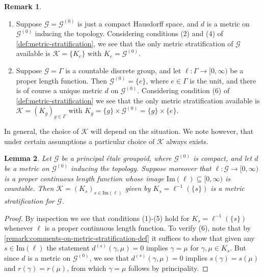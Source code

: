 \documentclass[11pt,a4paper,oneside,final,reqno]{amsart}
\newtheorem{lemma}{Lemma}[section]
\theoremstyle{definition}
\newtheorem{remark}[lemma]{Remark}
\newcommand{\G}{\mathcal{G}}
\newcommand{\Go}{\mathcal{G}^{(0)}}
\newcommand{\cK}{\mathcal{K}}
\newcommand{\Ima}{\mathrm{Im}}
\numberwithin{equation}{section}
\begin{document}
	\begin{remark}\label{remark:stratifications-degenerate-cases}
		\begin{enumerate}
			\item 	Suppose $\G = \Go$ is just a compact Hausdorff space, 
			and $d$ is a metric on $\Go$ inducing the topology.
			Considering 
			conditions (2) and (4)
			of \cref{def:metric-stratification}, we see that the only metric stratification of $\G$ available is $\cK= \{ K_e\}$ with $K_e = \Go$.
			\item Suppose $\G = \Gamma$ is a countable discrete group, and let $\ell \colon \Gamma \to [0,\infty)$ be a proper length function. Then $\Go = \{e\}$, where $e \in \Gamma$ is the unit, and there is of course a unique metric $d$ on $\Go$.  
			Considering condition (6) of \cref{def:metric-stratification} we see that the only metric stratification available is $\cK= (K_g)_{g\in \Gamma}$ with $K_g = \{g\} \times \Go = \{g\} \times \{e\}$. 
		\end{enumerate}
	
	\end{remark}
	
	In general, the choice of $\cK$ will depend on the situation. We note however, that under certain assumptions a particular choice of $\cK$ always exists. 
	
	\begin{lemma}\label{lemma:principal-metric-stratification}
		Let $\G$ be a principal \'etale groupoid, 
		where $\Go$ is compact, and let $d$ be a metric on $\Go$ inducing  the topology. 
		Suppose moreover that $\ell \colon \G \to [0,\infty)$ is a proper continuous  length function whose image $\Ima (\ell) \subseteq [0,\infty)$ is countable. Then $\cK = (K_s)_{s \in \Ima (\ell)}$ given by $K_s = \ell^{-1}(\{s\})$ is a metric stratification for $\G$. 
	\end{lemma}
	
	\begin{proof}
		By inspection we see that conditions (1)-(5) hold for $K_s = \ell^{-1}(\{s\})$ whenever $\ell$ is a proper continuous length function. To verify (6), note that by \cref{remark:comments-on-metric-stratification-def} it suffices to show that given any $s \in \Ima (\ell)$ the statement $d^{(s)}(\gamma , \mu) = 0$ implies $\gamma = \mu$ for $\gamma,\mu \in K_s$. But since $d$ is a metric on $\Go$, we see that $d^{(s)}(\gamma , \mu) = 0 $ implies $s(\gamma) = s(\mu)$ and $r(\gamma) = r(\mu)$, from which $\gamma = \mu$ follows by principality. 
	\end{proof}
	
\end{document}
